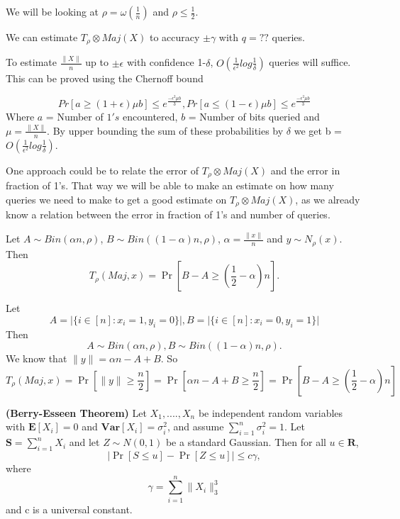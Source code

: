 \documentclass[11pt]{article}
\begin{document}
We will be looking at $\rho= \omega (\frac{1}{n})$ and $\rho \leq \frac{1}{2}$.

\BT
We can estimate $T_{\rho} \otimes Maj(X)$ to accuracy $\pm \gamma$ with $q=??$ queries. 
\ET

\BL
To estimate $\frac{\|X\|}{n}$ up to $\pm \epsilon$ with confidence 1-$\delta$, $O(\frac{1}{\epsilon^2}log\frac{1}{\delta})$ queries will suffice. 
\EL
\BPF
This can be proved using the Chernoff bound 

$$Pr[a \geq (1+\epsilon)\mu b] \leq e^{\frac{- \epsilon^2 \mu b}{3}}, Pr[a \leq (1-\epsilon)\mu b] \leq e^{\frac{- \epsilon^2 \mu b}{3}}$$
\noindent
Where $a$ = Number of $1's$ encountered, $b$ = Number of bits queried and $\mu = \frac{\|X\|}{n}$. By upper bounding the sum of these probabilities by $\delta$ we get b = $O(\frac{1}{\epsilon^2}log\frac{1}{\delta})$.
\EPF

 One approach could be to relate the error of  $T_\rho \otimes Maj(X) $ and the error in fraction of 1's. That way we will be able to make an estimate on how many queries we need to make to get a good estimate on $T_{\rho} \otimes Maj(X) $, as we already know a relation between the error in fraction of 1's and number of queries. \\


\BCM

Let $A \sim Bin(\alpha n, \rho)$, $B \sim Bin((1-\alpha)n, \rho)$, $\alpha = \frac{\|x\|}{n}$ and $y \sim N_{\rho}(x)$. Then $$T_\rho(Maj, x) = \Pr[B - A \geq (\frac{1}{2} - \alpha)n].$$

\ECM

\BPF

Let $$A = \big| \{ i \in [n]: x_i = 1, y_i = 0\} \big|, B = \big| \{ i \in [n]: x_i = 0, y_i = 1\} \big|$$ Then $$A \sim Bin(\alpha n, \rho), B \sim Bin((1-\alpha)n,\rho).$$ We know that $\|y\| = \alpha n - A + B$. So $$T_\rho(Maj, x) = \Pr[\|y\| \geq \frac{n}{2}] = \Pr[\alpha n - A + B \geq \frac{n}{2}] = \Pr[B - A \geq (\frac{1}{2} - \alpha)n]$$

\EPF

\BT
\textbf{(Berry-Esseen Theorem)} Let $X_1 , . . . . , X_n$ be independent random variables with $\textbf{E}[X_i]=0$ and $\textbf{Var}[X_i] = \sigma^{2}_{i}$, and assume $\sum_{i=1}^{n} \sigma^{2}_{i} = 1$. Let $\textbf{S}= \sum_{i=1}^{n} X_i$ and let $Z \sim N(0, 1)$ be a standard Gaussian. Then for all $u \in \mathbf{R}$, $$\big| \Pr[S \leq u] - \Pr[Z \leq u] \big| \leq c\gamma,$$ where $$\gamma = \sum\limits_{i=1}^{n} \|X_i\|^{3}_{3}$$ and c is a universal constant. 
\end{document}
